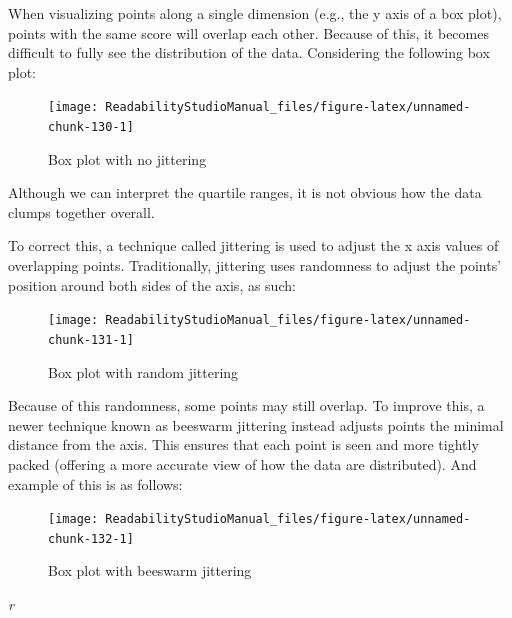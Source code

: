 \documentclass[
]{book}
\newenvironment{glsterm}
  {
  \bfseries
  }
  {
  }
\newenvironment{glsdef}
  {
  \noindent
  \flushleft
  \begin{adjustwidth}{2cm}{}
  }
  {
  \end{adjustwidth}
  }
\theoremstyle{definition}
\theoremstyle{definition}
\theoremstyle{definition}
\theoremstyle{definition}
\theoremstyle{remark}
\begin{document}
\begin{glsdef}

When visualizing points along a single dimension (e.g., the y axis of a box plot), points with the same score will overlap each other. Because of this, it becomes difficult to fully see the distribution of the data. Considering the following box plot:

\begin{figure}[H]

{\centering \texttt{[image: ReadabilityStudioManual\_files/figure-latex/unnamed-chunk-130-1]} 

}

\caption{Box plot with no jittering}\label{fig:unnamed-chunk-130}
\end{figure}

Although we can interpret the quartile ranges, it is not obvious how the data clumps together overall.

To correct this, a technique called jittering is used to adjust the x axis values of overlapping points. Traditionally, jittering uses randomness to adjust the points' position around both sides of the axis, as such:

\begin{figure}[H]

{\centering \texttt{[image: ReadabilityStudioManual\_files/figure-latex/unnamed-chunk-131-1]} 

}

\caption{Box plot with random jittering}\label{fig:unnamed-chunk-131}
\end{figure}

Because of this randomness, some points may still overlap. To improve this, a newer technique known as beeswarm jittering instead adjusts points the minimal distance from the axis. This ensures that each point is seen and more tightly packed (offering a more accurate view of how the data are distributed). And example of this is as follows:

\begin{figure}[H]

{\centering \texttt{[image: ReadabilityStudioManual\_files/figure-latex/unnamed-chunk-132-1]} 

}

\caption{Box plot with beeswarm jittering}\label{fig:unnamed-chunk-132}
\end{figure}

\end{glsdef}

\begin{glsterm}
\emph{r}

\end{glsterm}
\end{document}
